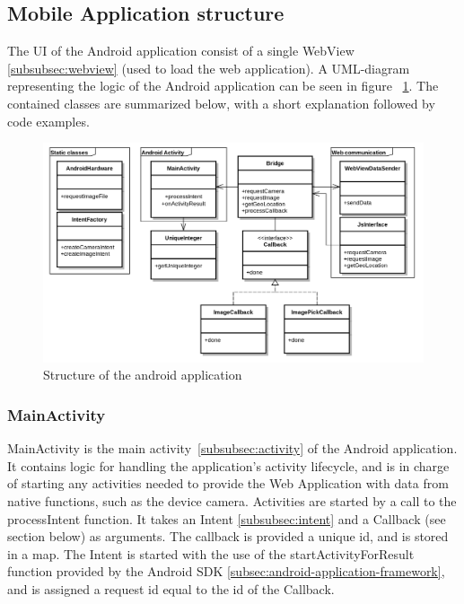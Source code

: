 \subsection{Mobile Application structure} \label{subsec:mobile-application-structure-native}
The UI of the Android application consist of a single WebView \ref{subsubsec:webview} (used to load the web application). A UML-diagram representing the logic of the Android application can be seen in figure ~\ref{fig:nativeuml}. The contained classes are summarized below, with a short explanation followed by code examples.

\begin{figure}
	\centering
    \includegraphics[width=150mm,natwidth=1000,natheight=750]{./img/polluxuml.png}
    \caption{Structure of the android application}
    \label{fig:nativeuml}
\end{figure}

\subsubsection{MainActivity} 
MainActivity is the main activity~\ref{subsubsec:activity} of the Android application. It contains logic for handling the application's activity lifecycle, and is in charge of starting any activities needed to provide the Web Application with data from native functions, such as the device camera. Activities are started by a call to the processIntent function. It takes an Intent \ref{subsubsec:intent} and a Callback (see section below) as arguments. The callback is provided a unique id, and is stored in a map. The Intent is started with the use of the startActivityForResult function provided by the Android SDK \ref{subsec:android-application-framework}, and is assigned a request id equal to the id of the Callback. 
\\\\
	
